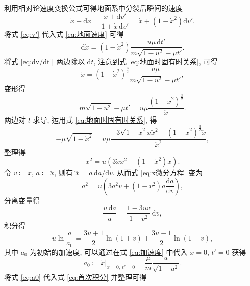 \documentclass{article}
\begin{document}
利用相对论速度变换公式可得地面系中分裂后瞬间的速度
\begin{equation}
	\label{eq:地面速度}
	\dot x+\mathrm d\dot x=\frac{\dot x+\mathrm dv'}{1+\dot x\,\mathrm dv'}
	=\dot x+\left(1-\dot x^2\right)\mathrm dv'.
\end{equation}
将式 \ref{eq:v'} 代入式 \ref{eq:地面速度} 可得
\begin{equation}
	\label{eq:dv/dt'}
	\mathrm d\dot x=\left(1-\dot x^2\right)\frac{u\mu\,\mathrm dt'}{m\sqrt{1-u^2}-\mu t'}.
\end{equation}
将式 \ref{eq:dv/dt'} 两边除以 $\mathrm dt$, 注意到式 \ref{eq:地面时固有时关系}, 可得
\begin{equation}
	\label{eq:加速度}
	\ddot x=\left(1-\dot x^2\right)^{\frac32}\frac{u\mu}{m\sqrt{1-u^2}-\mu t'},
\end{equation}
变形得
\begin{equation}
	m\sqrt{1-u^2}-\mu t'=u\mu\frac{\left(1-\dot x^2\right)^{\frac32}}{\ddot x}.
\end{equation}
两边对 $t$ 求导, 运用式 \ref{eq:地面时固有时关系}, 得
\begin{equation}
	-\mu\sqrt{1-\dot x^2}=u\mu
	\frac{-3\sqrt{1-\dot x^2}\dot x\ddot x^2-\left(1-\dot x^2\right)^{\frac32}\dddot x}{\ddot x^2},
\end{equation}
整理得
\begin{equation}
	\label{eq:x微分方程}
	\ddot x^2=u\left(3\dot x\ddot x^2-\left(1-\dot x^2\right)\dddot x\right).
\end{equation}
令 $v\coloneqq \dot x$, $a\coloneqq \ddot x$, 则有 $\dddot x=a\,\mathrm da/\mathrm dv$.
从而式 \ref{eq:x微分方程} 变为
\begin{equation}
	a^2=u\left(3a^2v+\left(1-v^2\right)a\frac{\mathrm da}{\mathrm dv}\right),
\end{equation}
分离变量得
\begin{equation}
	\frac{u\,\mathrm da}{a}=\frac{1-3uv}{1-v^2}\,\mathrm dv,
\end{equation}
积分得
\begin{equation}
	\label{eq:首次积分}
	u\ln\frac a{a_0}=\frac{3u+1}2\ln\!\left(1+v\right)+\frac{3u-1}2\ln\!\left(1-v\right),
\end{equation}
其中 $a_0$ 为初始的加速度, 可以通过在式 \ref{eq:加速度} 中代入 $\dot x=0$, $t'=0$ 获得
\begin{equation}
	\label{eq:a0}
	a_0\coloneqq \left.\ddot x\right|_{\dot x=0,~t'=0}=\frac\mu m\frac u{\sqrt{1-u^2}}.
\end{equation}
将式 \ref{eq:a0} 代入式 \ref{eq:首次积分} 并整理可得
\end{document}
